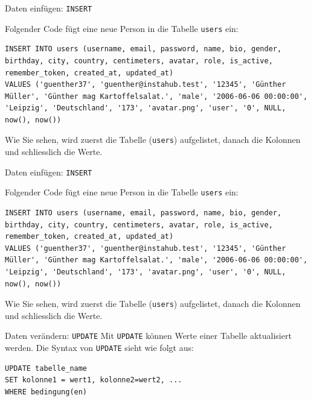 \begin{frame}[fragile]{Daten einfügen: \texorpdfstring{\lstinline[style=sql]|INSERT|}{INSERT}}
\begin{myexample}
Folgender Code fügt eine neue Person in die Tabelle \texttt{users} ein:
\begin{lstlisting}[style=sql]
INSERT INTO users (username, email, password, name, bio, gender, birthday, city, country, centimeters, avatar, role, is_active, remember_token, created_at, updated_at) 
VALUES ('guenther37', 'guenther@instahub.test', '12345', 'Günther Müller', 'Günther mag Kartoffelsalat.', 'male', '2006-06-06 00:00:00', 'Leipzig', 'Deutschland', '173', 'avatar.png', 'user', '0', NULL, now(), now())
\end{lstlisting}
Wie Sie sehen, wird zuerst die Tabelle (\texttt{users}) aufgelistet, danach die Kolonnen und schliesslich die Werte.
\end{myexample}
\end{frame}

\begin{frame}[fragile]{Daten einfügen: \texorpdfstring{\lstinline[style=sql]|INSERT|}{INSERT}}
\begin{myexample}
Folgender Code fügt eine neue Person in die Tabelle \texttt{users} ein:
\begin{lstlisting}[style=sql]
INSERT INTO users (username, email, password, name, bio, gender, birthday, city, country, centimeters, avatar, role, is_active, remember_token, created_at, updated_at) 
VALUES ('guenther37', 'guenther@instahub.test', '12345', 'Günther Müller', 'Günther mag Kartoffelsalat.', 'male', '2006-06-06 00:00:00', 'Leipzig', 'Deutschland', '173', 'avatar.png', 'user', '0', NULL, now(), now())
\end{lstlisting}
Wie Sie sehen, wird zuerst die Tabelle (\texttt{users}) aufgelistet, danach die Kolonnen und schliesslich die Werte.
\end{myexample}
\end{frame}

\begin{frame}[fragile]{Daten verändern: \texorpdfstring{\lstinline[style=sql]|UPDATE|}{UPDATE}}
Mit \lstinline[style=sql]|UPDATE| können Werte einer Tabelle aktualisiert werden. Die Syntax von \lstinline[style=sql]|UPDATE| sieht wie folgt aus:

\begin{lstlisting}[style=sql]
UPDATE tabelle_name
SET kolonne1 = wert1, kolonne2=wert2, ...
WHERE bedingung(en)
\end{lstlisting}
\end{frame}

